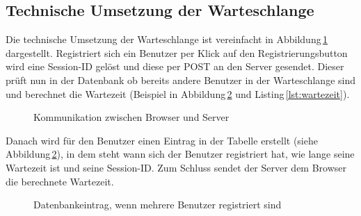 \subsection{Technische Umsetzung der Warteschlange}
Die technische Umsetzung der Warteschlange ist vereinfacht in Abbildung\,\ref{img:warteschlangeprinzip} dargestellt. Registriert sich ein Benutzer per Klick auf den Registrierungsbutton wird eine Session-ID gelöst und diese per POST an den Server gesendet. Dieser prüft nun in der Datenbank ob bereits andere Benutzer in der Warteschlange sind und berechnet die Wartezeit (Beispiel in Abbildung\,\ref{img:tblqueuemitBenutzer} und Listing\,\ref{lst:wartezeit}).

\begin{figure}[htbp!]
	\centering
	\caption{Kommunikation zwischen Browser und Server}
	\label{img:warteschlangeprinzip}
\end{figure}

\noindent
Danach wird für den Benutzer einen Eintrag in der Tabelle erstellt (siehe Abbildung\,\ref{img:tblqueuemitBenutzer}), in dem steht wann sich der Benutzer registriert hat, wie lange seine Wartezeit ist und seine Session-ID. Zum Schluss sendet der Server dem Browser die berechnete Wartezeit.

\begin{figure}[htbp!]
	\centering
	\caption{Datenbankeintrag, wenn mehrere Benutzer registriert sind}
	\label{img:tblqueuemitBenutzer}
\end{figure}

